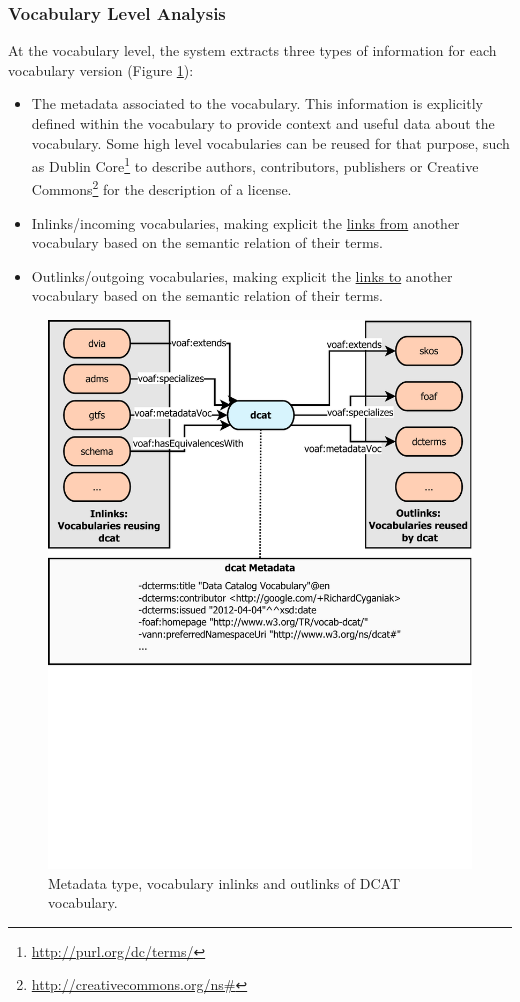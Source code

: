 \documentclass{iosart2c}
\begin{document}
\subsubsection{Vocabulary Level Analysis}\label{sec:vocabLevelAnalysis}
At the vocabulary level, the system extracts three types of information for each vocabulary version (Figure \ref{fig:dcat}):
\begin{itemize}
\item The metadata associated to the vocabulary. This information is explicitly defined within the vocabulary to provide context and useful data about the vocabulary. Some high level vocabularies can be reused for that purpose, such as Dublin Core\footnote{\url{http://purl.org/dc/terms/}} to describe authors, contributors, publishers or Creative Commons\footnote{\url{http://creativecommons.org/ns\#}} for the description of a license.

\item Inlinks/incoming vocabularies, making explicit the \underline{links from} another vocabulary based on the semantic relation of their terms.

\item Outlinks/outgoing vocabularies, making explicit the \underline{links to} another vocabulary based on the semantic relation of their terms.
\end{itemize}

\begin{figure}[ht!b]
\includegraphics[trim={0cm 10cm 0cm 0cm},width=1\textwidth]{FlowCharts/DCAT.pdf}
\caption{Metadata type, vocabulary inlinks and outlinks of DCAT vocabulary.}
\label{fig:dcat}
\end{figure}
\end{document}
